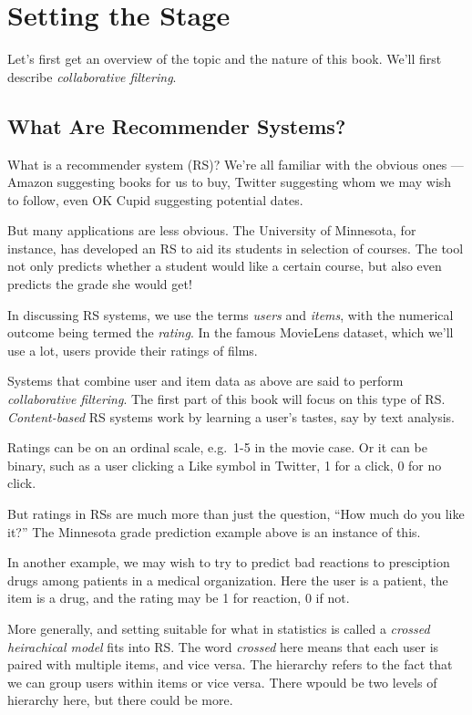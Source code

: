 \chapter{Setting the Stage}  
\label{chap:prologue} 

Let's first get an overview of the topic and the nature of this book.
We'll first describe \textit{collaborative filtering}. 

\section{What Are Recommender Systems?}

What is a recommender system (RS)?  We're all familiar with the obvious
ones --- Amazon suggesting books for us to buy, Twitter suggesting whom
we may wish to follow, even OK Cupid suggesting potential dates.

But many applications are less obvious.  The University of Minnesota,
for instance, has developed an RS to aid its students in selection of
courses.  The tool not only predicts whether a student would like a
certain course, but also even predicts the grade she would get!

In discussing RS systems, we use the terms \textit{users} and
\textit{items}, with the numerical outcome being
termed the \textit{rating}.  In the famous MovieLens dataset, which
we'll use a lot, users provide their ratings of films.

Systems that combine user and item data as above are said to perform
\textit{collaborative filtering}.  The first part of this book will
focus on this type of RS.  \textit{Content-based} RS systems work by
learning a user's tastes, say by text analysis.

Ratings can be on an ordinal scale, e.g.\ 1-5 in the movie case.  Or it
can be binary, such as a user clicking a Like symbol in Twitter, 1 for a
click, 0 for no click.

But ratings in RSs are much more than just the question, ``How much do
you like it?''  The Minnesota grade prediction example above is an
instance of this.

In another example, we may wish to try to predict bad reactions to
presciption drugs among patients in a medical organization.  Here the
user is a patient, the item is a drug, and the rating may be 1 for
reaction, 0 if not.  

More generally, and setting suitable for what in statistics is called
a \textit{crossed heirachical model} fits into RS.  The word
\textit{crossed} here means that each user is paired with multiple
items, and vice versa.  The hierarchy refers to the fact that we can
group users within items or vice versa.  There wpould be two levels of
hierarchy here, but there could be more.  

